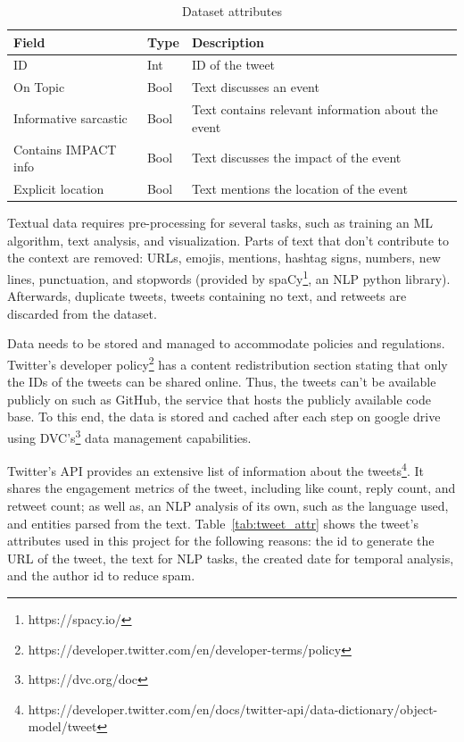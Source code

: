 \begin{table}
  \center
  \label{tab:dataset_attr}
  \begin{tabular}{|l|l|l|}
    \hline
    Field & Type & Description \\
    \hline
    ID & Int & ID of the tweet\\
    \hline
    On Topic  & Bool & Text discusses an event \\
    \hline
    Informative sarcastic  & Bool & Text contains relevant information about the event \\
    \hline
    Contains IMPACT info & Bool & Text discusses the impact of the event \\
    \hline
    Explicit location & Bool & Text mentions the location of the event \\
    \hline
  \end{tabular}
  \caption{Dataset attributes}
\end{table}

Textual data requires pre-processing for several tasks, such as training an \ac{ML} algorithm, text
analysis, and visualization. Parts of text that don't contribute to the context are removed:
\ac{URL}s, emojis, mentions, hashtag signs, numbers, new lines, punctuation, and stopwords (provided
by spaCy\footnote{https://spacy.io/}, an \ac{NLP} python library). Afterwards, duplicate tweets,
tweets containing no text, and retweets are discarded from the dataset.

Data needs to be stored and managed to accommodate policies and regulations. Twitter's developer
policy\footnote{https://developer.twitter.com/en/developer-terms/policy} has a content
redistribution section stating that only the IDs of the tweets can be shared online. Thus, the
tweets can't be available publicly on such as GitHub, the service that hosts the publicly available
code base. To this end, the data is stored and cached after each step on google drive using
\ac{DVC}'s\footnote{https://dvc.org/doc} data management capabilities.


Twitter's API provides an extensive list of information about the
tweets\footnote{https://developer.twitter.com/en/docs/twitter-api/data-dictionary/object-model/tweet}.
It shares the engagement metrics of the tweet, including like count, reply count, and retweet count;
as well as, an \ac{NLP} analysis of its own, such as the language used, and entities parsed from the
text. Table~\ref{tab:tweet_attr} shows the tweet's attributes used in this project for the following reasons: the id to
generate the \ac{URL} of the tweet, the text for \ac{NLP} tasks, the created date for temporal
analysis, and the author id to reduce spam.

